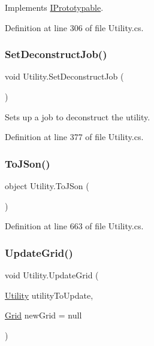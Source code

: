 Implements \hyperlink{interface_i_prototypable_a024d752c4be655a7166db5718f1fad6a}{I\+Prototypable}.



Definition at line 306 of file Utility.\+cs.

\mbox{\label{class_utility_a47849b1b0e692c3736df84a0944d8312}} 
\subsubsection{\texorpdfstring{Set\+Deconstruct\+Job()}{SetDeconstructJob()}}
{\footnotesize\ttfamily void Utility.\+Set\+Deconstruct\+Job (\begin{DoxyParamCaption}{ }\end{DoxyParamCaption})}



Sets up a job to deconstruct the utility. 



Definition at line 377 of file Utility.\+cs.

\mbox{\label{class_utility_a958b42276dab1f260988a4104a948fd6}} 
\subsubsection{\texorpdfstring{To\+J\+Son()}{ToJSon()}}
{\footnotesize\ttfamily object Utility.\+To\+J\+Son (\begin{DoxyParamCaption}{ }\end{DoxyParamCaption})}



Definition at line 663 of file Utility.\+cs.

\mbox{\label{class_utility_aef8d5581e49a8841dbd15f9d0f6b6c3c}} 
\subsubsection{\texorpdfstring{Update\+Grid()}{UpdateGrid()}}
{\footnotesize\ttfamily void Utility.\+Update\+Grid (\begin{DoxyParamCaption}\item[{\hyperlink{class_utility}{Utility}}]{utility\+To\+Update,  }\item[{\hyperlink{class_project_porcupine_1_1_power_network_1_1_grid}{Grid}}]{new\+Grid = {\ttfamily null} }\end{DoxyParamCaption})}



